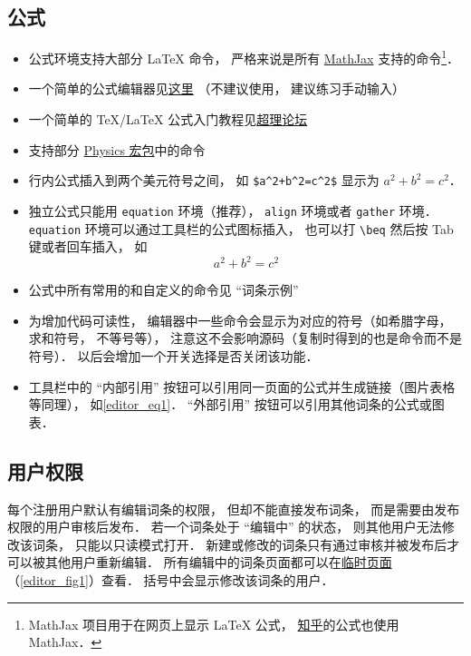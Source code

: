 \subsection{公式}
\begin{itemize}
\item 公式环境支持大部分 LaTeX 命令， 严格来说是所有 \href{https://www.mathjax.org/}{MathJax} 支持的命令\footnote{MathJax 项目用于在网页上显示 LaTeX 公式， \href{https://www.zhihu.com/}{知乎}的公式也使用 MathJax．}．
\item 一个简单的公式编辑器见\href{https://www.codecogs.com/latex/eqneditor.php}{这里} （不建议使用， 建议练习手动输入）
\item 一个简单的 TeX/LaTeX 公式入门教程见\href{https://chaoli.club/index.php/211}{超理论坛}
\item 支持部分 \href{http://mirrors.ibiblio.org/CTAN/macros/latex/contrib/physics/physics.pdf}{Physics 宏包}中的命令
\item 行内公式插入到两个美元符号之间， 如 \lstinline|$a^2+b^2=c^2$| 显示为 $a^2 + b^2 = c^2$．
\item 独立公式只能用 \lstinline|equation| 环境（推荐）， \lstinline|align| 环境或者 \lstinline|gather| 环境． \lstinline|equation| 环境可以通过工具栏的公式图标插入， 也可以打 \lstinline|\beq| 然后按 Tab 键或者回车插入， 如
\begin{equation}\label{editor_eq1}
a^2 + b^2 = c^2
\end{equation}
\item 公式中所有常用的和自定义的命令见 “词条示例”
\item 为增加代码可读性， 编辑器中一些命令会显示为对应的符号（如希腊字母， 求和符号， 不等号等）， 注意这不会影响源码（复制时得到的也是命令而不是符号）． 以后会增加一个开关选择是否关闭该功能．
\item 工具栏中的 “内部引用” 按钮可以引用同一页面的公式并生成链接（图片表格等同理）， 如\autoref{editor_eq1}． “外部引用” 按钮可以引用其他词条的公式或图表．
\end{itemize}

\subsection{用户权限}
每个注册用户默认有编辑词条的权限， 但却不能直接发布词条， 而是需要由发布权限的用户审核后发布． 若一个词条处于 “编辑中” 的状态， 则其他用户无法修改该词条， 只能以只读模式打开． 新建或修改的词条只有通过审核并被发布后才可以被其他用户重新编辑． 所有编辑中的词条页面都可以在\href{http://wuli.wiki/changed/changed.html}{临时页面}（\autoref{editor_fig1}）查看． 括号中会显示修改该词条的用户．

